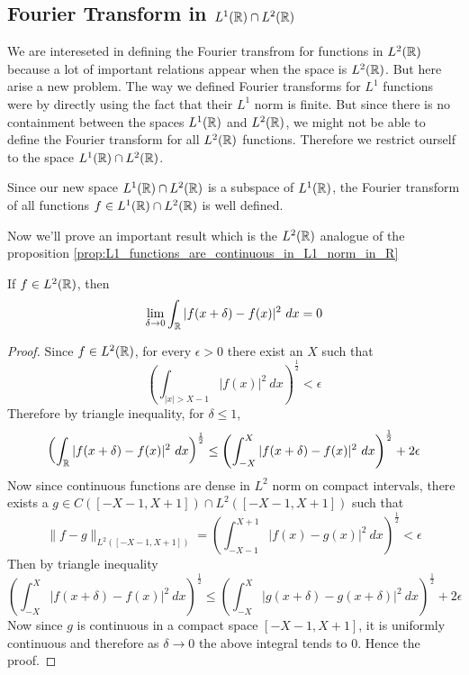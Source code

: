 \subsection{Fourier Transform in $L^1(\mathbb R) \cap 
L^2(\mathbb R)$}
We are intereseted in defining the Fourier transfrom for functions in $L^2(\mathbb R)$ because a lot of important relations appear when the space is $L^2(\mathbb R)$. But here arise a new problem. The way we defined Fourier transforms for $L^1$ functions were by directly using the fact that their $L^1$ norm is finite. But since there is no containment between the spaces $L^1(\mathbb R)$ and $L^2(\mathbb R)$, we might not be able to define the Fourier transform for all $L^2(\mathbb R)$ functions. Therefore we restrict ourself to the space $L^1(\mathbb R) \cap L^2(\mathbb R)$. 

Since our new space $L^1(\mathbb R) \cap L^2(\mathbb R)$ is a subspace of $L^1(\mathbb R)$, the Fourier transform of all functions $f \in L^1(\mathbb R) \cap L^2(\mathbb R)$ is well defined. 

Now we'll prove an important result which is the $L^2(\mathbb R)$ analogue of the proposition \ref{prop:L1_functions_are_continuous_in_L1_norm_in_R}

\begin{proposition}
  \label{prop:L2_functions_are_continuous_in_L2_norm_in_R}
  If $f\in L^2(\mathbb R)$, then $$\lim_{\delta \to 0} \int_\mathbb R |f(x+\delta) - f(x)|^2 \ dx = 0 $$
\end{proposition}
\begin{proof}
  Since $f\in L^2(\mathbb R)$, for every $\epsilon > 0$ there exist an $X$ such that $$\left( \int_{|x|> X-1} |f(x)|^2 \ dx \right)^{\frac{1}{2}} < \epsilon$$
  Therefore by triangle inequality, for $\delta \le 1$, $$ \left( \int_\mathbb R |f(x+\delta) - f(x)|^2 \ dx \right)^{\frac{1}{2}} \le \left( \int_{-X}^X |f(x+\delta) - f(x)|^2 \ dx \right)^{\frac{1}{2}} + 2\epsilon$$
  Now since continuous functions are dense in $L^2$ norm on compact intervals, there exists a $g \in C([-X-1, X+1])\cap L^2([-X-1, X+1])$ such that $$ \|f-g\|_{L^2([-X-1, X+1])} = \left( \int_{-X-1}^{X+1} |f(x) - g(x)|^2 \ dx \right)^{\frac{1}{2}} < \epsilon $$
  Then by triangle inequality $$ \left( \int_{-X}^X |f(x+\delta) - f(x)|^2 \ dx \right)^{\frac{1}{2}} \le \left( \int_{-X}^X |g(x+\delta) - g(x+\delta)|^2 \ dx \right)^{\frac{1}{2}} + 2\epsilon $$
  Now since $g$ is continuous in a compact space $[-X-1, X+1]$, it is uniformly continuous and therefore as $\delta \to 0$ the above integral tends to $0$. Hence the proof.
\end{proof}

